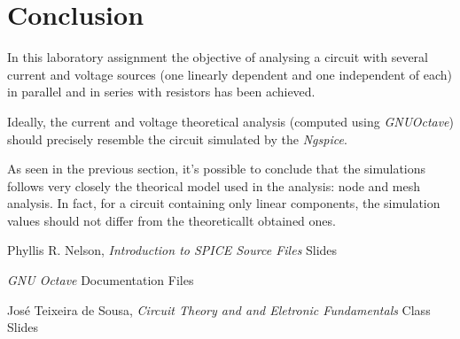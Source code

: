 \section{Conclusion}
\label{sec:conclusion}



In this laboratory assignment the objective of analysing a circuit with several current and voltage sources (one linearly dependent and one independent of each) in parallel and in series with resistors has been
achieved.

Ideally, the current and voltage theoretical analysis (computed using \textit{GNUOctave}) should precisely resemble the circuit simulated by the \textit{Ngspice}. 

As seen in the previous section, it's possible to conclude that the simulations follows very closely the theorical model used in the analysis: node and mesh analysis. In fact, for a circuit containing only linear components, the simulation values should not differ from the theoreticallt obtained ones.

\clearpage

\begin{thebibliography}{}

Phyllis R. Nelson, \emph{Introduction to SPICE Source Files} Slides

\emph{GNU Octave} Documentation Files 

José Teixeira de Sousa, \emph{Circuit Theory and and Eletronic Fundamentals} Class Slides

\end{thebibliography}